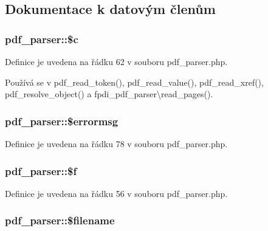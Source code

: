 \subsection{Dokumentace k datovým členům}
\hypertarget{classpdf__parser_a500d261de630e6f82e73926e2c1a440e}{
\subsubsection[{\$c}]{\setlength{\rightskip}{0pt plus 5cm}pdf\-\_\-parser\-::\$c}}\label{classpdf__parser_a500d261de630e6f82e73926e2c1a440e}


Definice je uvedena na řádku 62 v souboru pdf\-\_\-parser.\-php.



Používá se v pdf\-\_\-read\-\_\-token(), pdf\-\_\-read\-\_\-value(), pdf\-\_\-read\-\_\-xref(), pdf\-\_\-resolve\-\_\-object() a fpdi\-\_\-pdf\-\_\-parser\textbackslash{}read\-\_\-pages().

\hypertarget{classpdf__parser_a1d781fd6f727bd64d7f05be1e41eb970}{
\subsubsection[{\$errormsg}]{\setlength{\rightskip}{0pt plus 5cm}pdf\-\_\-parser\-::\$errormsg}}\label{classpdf__parser_a1d781fd6f727bd64d7f05be1e41eb970}


Definice je uvedena na řádku 78 v souboru pdf\-\_\-parser.\-php.

\hypertarget{classpdf__parser_a09220ff1ed240dcfd2ee1df7ccbd9a7b}{
\subsubsection[{\$f}]{\setlength{\rightskip}{0pt plus 5cm}pdf\-\_\-parser\-::\$f}}\label{classpdf__parser_a09220ff1ed240dcfd2ee1df7ccbd9a7b}


Definice je uvedena na řádku 56 v souboru pdf\-\_\-parser.\-php.

\hypertarget{classpdf__parser_a5b89d1e46a5b6f7a1986432c034c3887}{
\subsubsection[{\$filename}]{\setlength{\rightskip}{0pt plus 5cm}pdf\-\_\-parser\-::\$filename}}\label{classpdf__parser_a5b89d1e46a5b6f7a1986432c034c3887}


